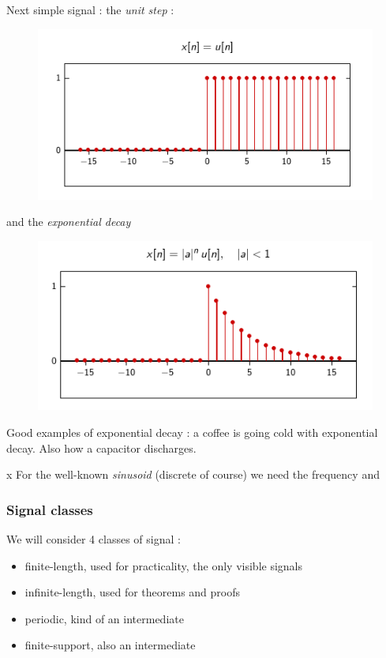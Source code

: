 \documentclass[11pt,a4paper]{article}
\numberwithin{equation}{section}
\begin{document}
Next simple signal : the \textit{unit step} :
\begin{figure}
    \includegraphics[scale=0.6]{images/unit_signal}
\end{figure}
and the \textit{exponential decay}
\begin{figure}
    \includegraphics[scale=0.6]{images/expo_decay}
\end{figure}
\begin{example}
    Good examples of exponential decay : a coffee is going cold with exponential decay. Also how a capacitor discharges.
\end{example}x
For the well-known \textit{sinusoid} (discrete of course) we need the frequency and 
\subsubsection{Signal classes}
We will consider 4 classes of signal : 
\begin{itemize}
    \item finite-length, used for practicality, the only visible signals
    \item infinite-length, used for theorems and proofs
    \item periodic, kind of an intermediate
    \item finite-support, also an intermediate
\end{itemize}
\end{document}
